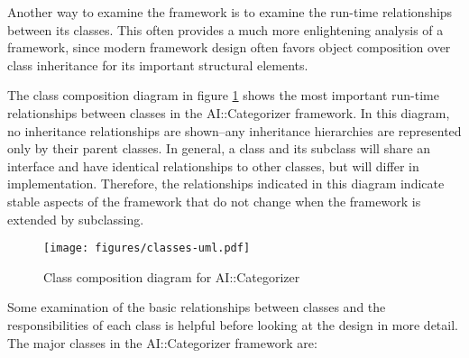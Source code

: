 \documentclass[a4paper]{report}
\begin{document}
Another way to examine the framework is to examine the run-time
relationships between its classes.  This often provides a much more
enlightening analysis of a framework, since modern framework design
often favors object composition over class inheritance for its
important structural elements. \cite[p. 20]{gamma:95}

The class composition diagram in figure \ref{classes-uml} shows the
most important run-time relationships between classes in the
AI::Categorizer framework.  In this diagram, no inheritance
relationships are shown--any inheritance hierarchies are represented
only by their parent classes.  In general, a class and its subclass
will share an interface and have identical relationships to other
classes, but will differ in implementation.  Therefore, the
relationships indicated in this diagram indicate stable aspects of the
framework that do not change when the framework is extended by
subclassing.

\begin{figure}
\texttt{[image: figures/classes-uml.pdf]}
\caption{Class composition diagram for AI::Categorizer}
\label{classes-uml}
\end{figure}

Some examination of the basic relationships between classes and the
responsibilities of each class is helpful before looking at the design
in more detail.  The major classes in the AI::Categorizer framework
are:
\end{document}
